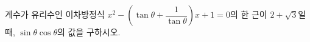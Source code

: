 계수가 유리수인 이차방정식 $x^2-\left(\tan\theta+\dfrac{1}{\tan\theta}\right)x+1=0$의 한 근이 $2+\sqrt{3}$일 때, $\sin\theta\cos\theta$의 값을 구하시오.
